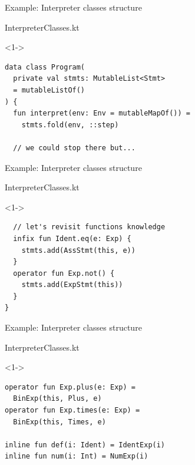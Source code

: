 \documentclass[hyperref={pdfpagelabels=false},xcolor={dvipsnames},compress]{beamer}
\begin{document}
    \begin{frame}[fragile]{Example: Interpreter classes structure}
        \begin{exampleblock}{InterpreterClasses.kt}
            \begin{onlyenv}<1->
                \begin{lstlisting}
data class Program(
  private val stmts: MutableList<Stmt>
  = mutableListOf()
) {
  fun interpret(env: Env = mutableMapOf()) =
    stmts.fold(env, ::step)

  // we could stop there but...
                \end{lstlisting}
            \end{onlyenv}
        \end{exampleblock}
    \end{frame}

    \begin{frame}[fragile]{Example: Interpreter classes structure}
        \begin{exampleblock}{InterpreterClasses.kt}
            \begin{onlyenv}<1->
                \begin{lstlisting}
  // let's revisit functions knowledge
  infix fun Ident.eq(e: Exp) {
    stmts.add(AssStmt(this, e))
  }
  operator fun Exp.not() {
    stmts.add(ExpStmt(this))
  }
}
                \end{lstlisting}
            \end{onlyenv}
        \end{exampleblock}
    \end{frame}

    \begin{frame}[fragile]{Example: Interpreter classes structure}
        \begin{exampleblock}{InterpreterClasses.kt}
            \begin{onlyenv}<1->
                \begin{lstlisting}
operator fun Exp.plus(e: Exp) =
  BinExp(this, Plus, e)
operator fun Exp.times(e: Exp) = 
  BinExp(this, Times, e)

inline fun def(i: Ident) = IdentExp(i)
inline fun num(i: Int) = NumExp(i)
                \end{lstlisting}
            \end{onlyenv}
        \end{exampleblock}
    \end{frame}
\end{document}
